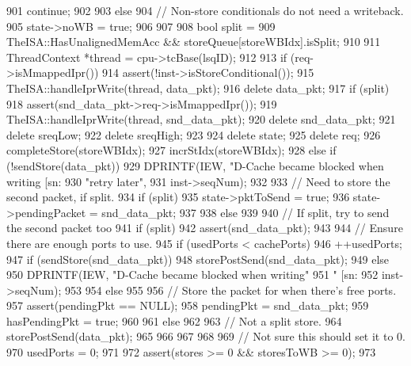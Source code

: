 \begin{DoxyCode}
{{{{901                 continue;
902             }
903         } else {
904             // Non-store conditionals do not need a writeback.
905             state->noWB = true;
906         }
907 
908         bool split =
909             TheISA::HasUnalignedMemAcc && storeQueue[storeWBIdx].isSplit;
910 
911         ThreadContext *thread = cpu->tcBase(lsqID);
912 
913         if (req->isMmappedIpr()) {
914             assert(!inst->isStoreConditional());
915             TheISA::handleIprWrite(thread, data_pkt);
916             delete data_pkt;
917             if (split) {
918                 assert(snd_data_pkt->req->isMmappedIpr());
919                 TheISA::handleIprWrite(thread, snd_data_pkt);
920                 delete snd_data_pkt;
921                 delete sreqLow;
922                 delete sreqHigh;
923             }
924             delete state;
925             delete req;
926             completeStore(storeWBIdx);
927             incrStIdx(storeWBIdx);
928         } else if (!sendStore(data_pkt)) {
929             DPRINTF(IEW, "D-Cache became blocked when writing [sn:%
930                     "retry later\n",
931                     inst->seqNum);
932 
933             // Need to store the second packet, if split.
934             if (split) {
935                 state->pktToSend = true;
936                 state->pendingPacket = snd_data_pkt;
937             }
938         } else {
939 
940             // If split, try to send the second packet too
941             if (split) {
942                 assert(snd_data_pkt);
943 
944                 // Ensure there are enough ports to use.
945                 if (usedPorts < cachePorts) {
946                     ++usedPorts;
947                     if (sendStore(snd_data_pkt)) {
948                         storePostSend(snd_data_pkt);
949                     } else {
950                         DPRINTF(IEW, "D-Cache became blocked when writing"
951                                 " [sn:%
952                                 inst->seqNum);
953                     }
954                 } else {
955 
956                     // Store the packet for when there's free ports.
957                     assert(pendingPkt == NULL);
958                     pendingPkt = snd_data_pkt;
959                     hasPendingPkt = true;
960                 }
961             } else {
962 
963                 // Not a split store.
964                 storePostSend(data_pkt);
965             }
966         }
967     }
968 
969     // Not sure this should set it to 0.
970     usedPorts = 0;
971 
972     assert(stores >= 0 && storesToWB >= 0);
973 }
\end{DoxyCode}


